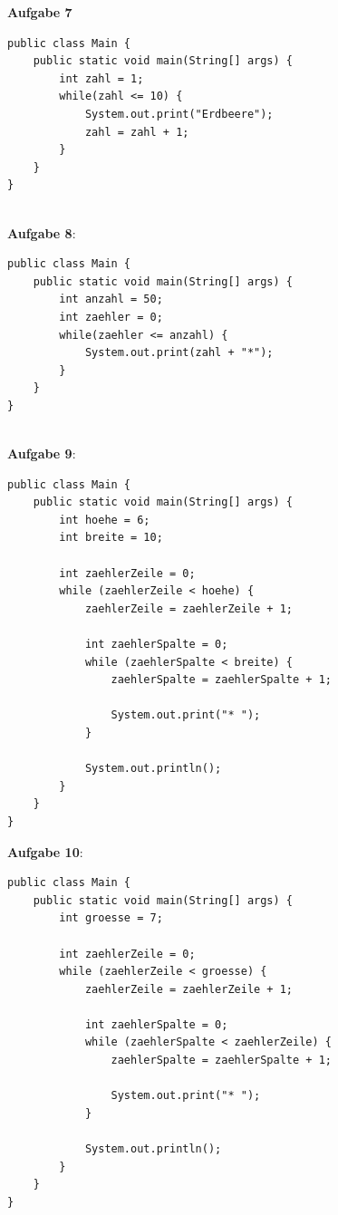\documentclass[ngerman,11pt]{article}
\begin{document}
    \textbf{Aufgabe 7}

    \begin{lstlisting}
public class Main {
    public static void main(String[] args) {
        int zahl = 1;
        while(zahl <= 10) {
            System.out.print("Erdbeere");
            zahl = zahl + 1;
        }
    }
}
    \end{lstlisting} \\

    \textbf{Aufgabe 8}:

    \begin{lstlisting}
public class Main {
    public static void main(String[] args) {
        int anzahl = 50;
        int zaehler = 0;
        while(zaehler <= anzahl) {
            System.out.print(zahl + "*");
        }
    }
}
    \end{lstlisting} \\

    \textbf{Aufgabe 9}:

    \begin{lstlisting}[caption=\lstinline{Muster: Rechteck}]
public class Main {
    public static void main(String[] args) {
        int hoehe = 6;
        int breite = 10;

        int zaehlerZeile = 0;
        while (zaehlerZeile < hoehe) {
            zaehlerZeile = zaehlerZeile + 1;

            int zaehlerSpalte = 0;
            while (zaehlerSpalte < breite) {
                zaehlerSpalte = zaehlerSpalte + 1;

                System.out.print("* ");
            }

            System.out.println();
        }
    }
}
    \end{lstlisting}

    \textbf{Aufgabe 10}:

    \begin{lstlisting}[caption=\lstinline{Muster: Dreieck}]
public class Main {
    public static void main(String[] args) {
        int groesse = 7;

        int zaehlerZeile = 0;
        while (zaehlerZeile < groesse) {
            zaehlerZeile = zaehlerZeile + 1;

            int zaehlerSpalte = 0;
            while (zaehlerSpalte < zaehlerZeile) {
                zaehlerSpalte = zaehlerSpalte + 1;

                System.out.print("* ");
            }

            System.out.println();
        }
    }
}
    \end{lstlisting} \\
\end{document}
